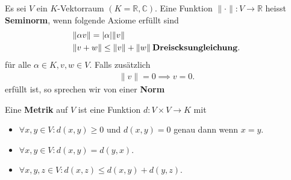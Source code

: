 \documentclass[../Algebra_script.tex]{subfiles}
\begin{document}
    \begin{definition}[Seminorm]
        Es sei $V$ ein $K$-Vektorraum $(K = \mathbb{R}, \mathbb{C})$. Eine Funktion $\|\cdot\| : V \to \mathbb{R}$ heisst \textbf{Seminorm}, wenn folgende
        Axiome erfüllt sind 
        \begin{align*}
            &\|\alpha v\| = |\alpha|\|v\|\\
            &\|v + w\| \le \|v\| + \|w\| \: \text{\textbf{Dreiscksungleichung}}
        .\end{align*}
        für alle $\alpha \in K, v,w \in V$. Falls zusätzlich
        \begin{align*}
            \|v\| = 0 \implies v = 0
        .\end{align*}
        erfüllt ist, so sprechen wir von einer \textbf{Norm}
    \end{definition}

    \begin{definition}[Metrik]
        Eine \textbf{Metrik} auf $V$ ist eine Funktion $d:V \times V \to K$ mit 
        \begin{itemize}
            \item $\forall x,y \in V: d(x,y) \ge 0$ und $d(x,y) = 0$ genau dann wenn $x=y$.
            \item $\forall x, y \in V: d(x, y) = d(y, x)$.
            \item $\forall x, y, z \in V: d(x, z) \le d(x, y) + d(y, z)$.
        \end{itemize}
    \end{definition}
\end{document}
